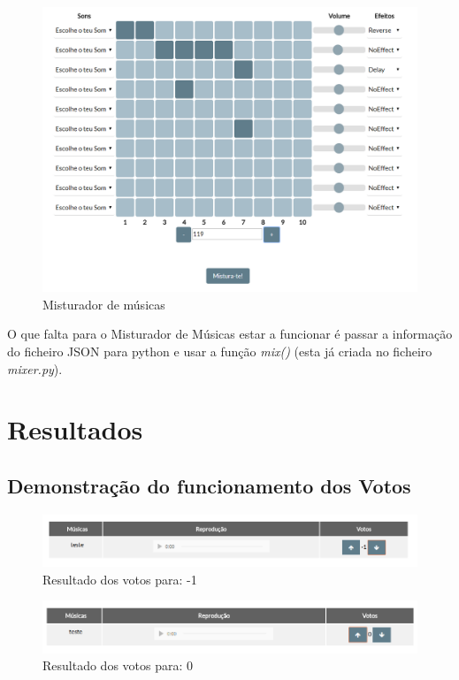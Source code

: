 \documentclass{report}
\begin{document}
	\begin{figure} [h]
		\centering
		\includegraphics[scale=0.5]{img/misturador.PNG}
		\caption{Misturador de músicas}
	\end{figure}

O que falta para o Misturador de Músicas estar a funcionar é passar a informação do ficheiro JSON para python e usar a função \textit{mix()} (esta já criada no ficheiro \textit{mixer.py}).

\chapter{Resultados}
\label{resultados}

\section{Demonstração do funcionamento dos Votos}
\begin{figure} [h]
	\centering
	\includegraphics [scale = 0.4] {img/votos-1}
	\caption{Resultado dos votos para: -1}
\end{figure}

\begin{figure} [h]
	\centering
	\includegraphics [scale = 0.4] {img/votos0}
	\caption{Resultado dos votos para: 0}
\end{figure}
\end{document}
